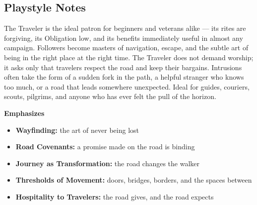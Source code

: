 \subsection*{Playstyle Notes}
The Traveler is the ideal patron for beginners and veterans alike --- its rites are forgiving, its Obligation low, and its benefits immediately useful in almost any campaign. Followers become masters of navigation, escape, and the subtle art of being in the right place at the right time. The Traveler does not demand worship; it asks only that travelers respect the road and keep their bargains. Intrusions often take the form of a sudden fork in the path, a helpful stranger who knows too much, or a road that leads somewhere unexpected. Ideal for guides, couriers, scouts, pilgrims, and anyone who has ever felt the pull of the horizon.

\noindent\textbf{Emphasizes}
\begin{itemize}
  \item \textbf{Wayfinding:} the art of never being lost
  \item \textbf{Road Covenants:} a promise made on the road is binding
  \item \textbf{Journey as Transformation:} the road changes the walker
  \item \textbf{Thresholds of Movement:} doors, bridges, borders, and the spaces between
  \item \textbf{Hospitality to Travelers:} the road gives, and the road expects
\end{itemize}


